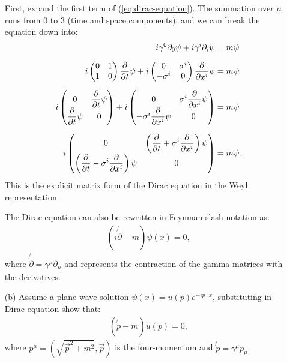 \begin{enumerate}
    First, expand the first term of (\ref{eq:dirac-equation}). The summation over $\mu$ runs from 0 to 3 (time and space components), and we can break the equation down into:
    \begin{align}
        i\gamma^0 \partial_0 \psi + i\gamma^i \partial_i \psi &= m\psi\notag\\[6pt]
        i
        \begin{pmatrix}
        0 & 1 \\
        1 & 0
        \end{pmatrix}\frac{\partial}{\partial t} \psi+i
        \begin{pmatrix}
        0 & \sigma^i \\
        -\sigma^i & 0
        \end{pmatrix}
        \frac{\partial}{\partial x^i} \psi&=m\psi\notag\\[6pt]
        i
        \begin{pmatrix}
        0 & \displaystyle\frac{\partial}{\partial t} \psi \\
        \displaystyle\frac{\partial}{\partial t} \psi & 0
        \end{pmatrix}+i
        \begin{pmatrix}
        0 & \displaystyle\sigma^i \frac{\partial}{\partial x^i} \psi \\
        \displaystyle-\sigma^i \frac{\partial}{\partial x^i} \psi & 0
        \end{pmatrix}&=m\psi\notag\\[6pt]
        i \begin{pmatrix}
        0 & \displaystyle\left( \frac{\partial}{\partial t} + \sigma^i \frac{\partial}{\partial x^i} \right) \psi \\
        \displaystyle\left( \frac{\partial}{\partial t} - \sigma^i \frac{\partial}{\partial x^i} \right) \psi & 0
        \end{pmatrix}
        &= m \psi.
    \end{align}
    This is the explicit matrix form of the Dirac equation in the Weyl representation. 

    The Dirac equation can also be rewritten in Feynman slash notation as:
    \begin{align}
        (i\not{\partial} - m)\psi(x) = 0,\label{eq:feynmann-slashed}
    \end{align}
    where $\not{\partial} = \gamma^\mu \partial_\mu$ and represents the contraction of the gamma matrices with the derivatives. 
    \bigskip\bigskip\hline\hline\bigskip
    \item [(b)] Assume a plane wave solution $\psi(x) = u(p)e^{-ip \cdot x}$, substituting in Dirac equation show that:
    \begin{align}
    (\not{p} - m)u(p) = 0,
    \end{align}
    where $p^\mu = (\sqrt{\vec{p}^2 + m^2}, \vec{p})$ is the four-momentum and $\not{p} = \gamma^\mu p_\mu$.
    

\end{enumerate}
